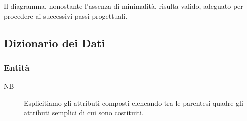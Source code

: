		Il diagramma, nonostante l'assenza di minimalità, risulta valido, adeguato per procedere ai successivi passi progettuali.
	
	\subsection{Dizionario dei Dati}
	\label{sec:data_dict}
		
		\subsubsection{Entità}
		\label{sec:entities}
			
			\begin{description}
				\item[NB] Esplicitiamo gli attributi composti elencando tra le parentesi quadre gli attributi semplici di cui sono costituiti.
			\end{description}
	
